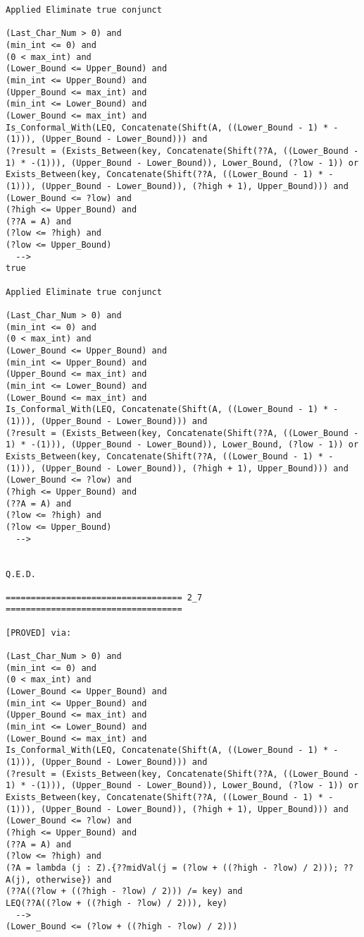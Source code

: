 \begin{lstlisting}[language=resolve]
Applied Eliminate true conjunct

(Last_Char_Num > 0) and
(min_int <= 0) and
(0 < max_int) and
(Lower_Bound <= Upper_Bound) and
(min_int <= Upper_Bound) and
(Upper_Bound <= max_int) and
(min_int <= Lower_Bound) and
(Lower_Bound <= max_int) and
Is_Conformal_With(LEQ, Concatenate(Shift(A, ((Lower_Bound - 1) * -(1))), (Upper_Bound - Lower_Bound))) and
(?result = (Exists_Between(key, Concatenate(Shift(??A, ((Lower_Bound - 1) * -(1))), (Upper_Bound - Lower_Bound)), Lower_Bound, (?low - 1)) or Exists_Between(key, Concatenate(Shift(??A, ((Lower_Bound - 1) * -(1))), (Upper_Bound - Lower_Bound)), (?high + 1), Upper_Bound))) and
(Lower_Bound <= ?low) and
(?high <= Upper_Bound) and
(??A = A) and
(?low <= ?high) and
(?low <= Upper_Bound)
  -->
true

Applied Eliminate true conjunct

(Last_Char_Num > 0) and
(min_int <= 0) and
(0 < max_int) and
(Lower_Bound <= Upper_Bound) and
(min_int <= Upper_Bound) and
(Upper_Bound <= max_int) and
(min_int <= Lower_Bound) and
(Lower_Bound <= max_int) and
Is_Conformal_With(LEQ, Concatenate(Shift(A, ((Lower_Bound - 1) * -(1))), (Upper_Bound - Lower_Bound))) and
(?result = (Exists_Between(key, Concatenate(Shift(??A, ((Lower_Bound - 1) * -(1))), (Upper_Bound - Lower_Bound)), Lower_Bound, (?low - 1)) or Exists_Between(key, Concatenate(Shift(??A, ((Lower_Bound - 1) * -(1))), (Upper_Bound - Lower_Bound)), (?high + 1), Upper_Bound))) and
(Lower_Bound <= ?low) and
(?high <= Upper_Bound) and
(??A = A) and
(?low <= ?high) and
(?low <= Upper_Bound)
  -->


Q.E.D.

=================================== 2_7 ===================================

[PROVED] via:

(Last_Char_Num > 0) and
(min_int <= 0) and
(0 < max_int) and
(Lower_Bound <= Upper_Bound) and
(min_int <= Upper_Bound) and
(Upper_Bound <= max_int) and
(min_int <= Lower_Bound) and
(Lower_Bound <= max_int) and
Is_Conformal_With(LEQ, Concatenate(Shift(A, ((Lower_Bound - 1) * -(1))), (Upper_Bound - Lower_Bound))) and
(?result = (Exists_Between(key, Concatenate(Shift(??A, ((Lower_Bound - 1) * -(1))), (Upper_Bound - Lower_Bound)), Lower_Bound, (?low - 1)) or Exists_Between(key, Concatenate(Shift(??A, ((Lower_Bound - 1) * -(1))), (Upper_Bound - Lower_Bound)), (?high + 1), Upper_Bound))) and
(Lower_Bound <= ?low) and
(?high <= Upper_Bound) and
(??A = A) and
(?low <= ?high) and
(?A = lambda (j : Z).{??midVal(j = (?low + ((?high - ?low) / 2))); ??A(j), otherwise}) and
(??A((?low + ((?high - ?low) / 2))) /= key) and
LEQ(??A((?low + ((?high - ?low) / 2))), key)
  -->
(Lower_Bound <= (?low + ((?high - ?low) / 2)))


\end{lstlisting}
